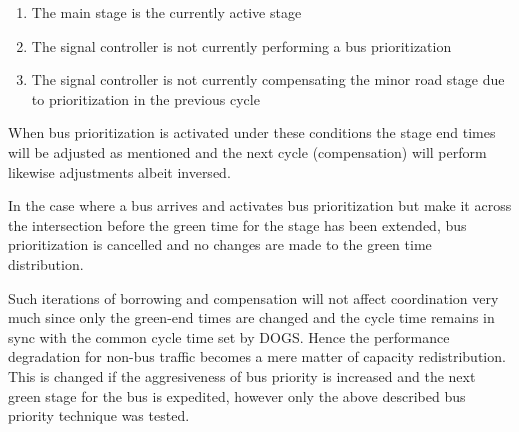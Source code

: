 \begin{enumerate}
\item The main stage is the currently active stage
\item The signal controller is not currently performing a bus prioritization
\item The signal controller is not currently compensating the minor road stage due to prioritization in the previous cycle
\end{enumerate}

When bus prioritization is activated under these conditions the stage end times will be adjusted as mentioned and the next cycle (compensation) will perform likewise adjustments albeit inversed.

In the case where a bus arrives and activates bus prioritization but make it across the intersection before the green time for the stage has been extended, bus prioritization is cancelled and no changes are made to the green time distribution.

Such iterations of borrowing and compensation will not affect coordination very much since only the green-end times are changed and the cycle time remains in sync with the common cycle time set by DOGS. Hence the performance degradation for non-bus traffic becomes a mere matter of capacity redistribution. This is changed if the aggresiveness of bus priority is increased and the next green stage for the bus is expedited, however only the above described bus priority technique was tested.